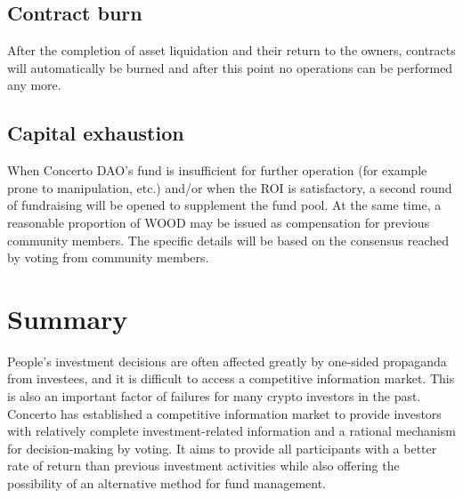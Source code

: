 \documentclass[UTF8]{article}
\begin{document}
\begin{multicols}{2}
\subsection{Contract burn}
After the completion of asset liquidation and their return to the owners, contracts will automatically be burned and after this point no operations can be performed any more.

\subsection{Capital exhaustion}
When Concerto DAO’s fund is insufficient for further operation (for example prone to manipulation, etc.) and/or when the ROI is satisfactory, a second round of fundraising will be opened to supplement the fund pool. At the same time, a reasonable proportion of WOOD may be issued as compensation for previous community members. The specific details will be based on the consensus reached by voting from community members.

\section{Summary}
People’s investment decisions are often affected greatly by one-sided propaganda from investees, and it is difficult to access a competitive information market. This is also an important factor of failures for many crypto investors in the past. Concerto has established a competitive information market to provide investors with relatively complete investment-related information and a rational mechanism for decision-making by voting. It aims to provide all participants with a better rate of return than previous investment activities while also offering the possibility of an alternative method for fund management.



\end{multicols}
\end{document}
